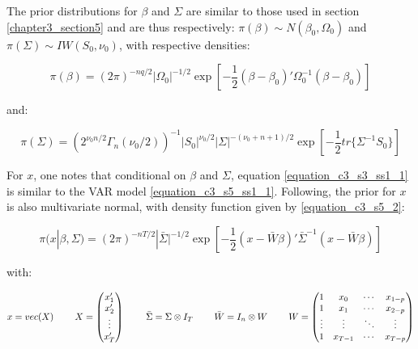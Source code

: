 The prior distributions for $\beta$ and $\Sigma$ are similar to those used in section \ref{chapter3_section5} and are thus respectively: $\pi(\beta) \sim N(\beta_0, \Omega_0)$ and $\pi(\Sigma) \sim IW(S_0, \nu_0)$, with respective densities:

\begin{equation}
\pi(\beta) = (2 \pi)^{-nq/2} |\Omega_0|^{-1/2} \exp \left[ -\frac{1}{2} (\beta - \beta_0)' \Omega_0^{-1} (\beta - \beta_0) \right]
\label{equation_c3_s3_ss2_3}
\end{equation}

and:

\begin{equation}
\pi(\Sigma) = (2^{\nu_0 n /2} \Gamma_n(\nu_0/2))^{-1} |S_0|^{\nu_0/2} |\Sigma|^{-(\nu_0+n+1)/2} \exp \left[ - \frac{1}{2} tr \{ \Sigma^{-1} S_0 \}  \right]
\label{equation_c3_s3_ss2_4}
\end{equation} 

For $x$, one notes that conditional on $\beta$ and $\Sigma$, equation \ref{equation_c3_s3_ss1_1} is similar to the VAR model \ref{equation_c3_s5_ss1_1}. Following, the prior for $x$ is also multivariate normal, with density function given by \ref{equation_c3_s5_2}:

\begin{equation}
\pi(x| \beta, \Sigma) = (2 \pi)^{-nT/2} |\bar{\Sigma}|^{-1/2} \exp \left[ -\frac{1}{2} (x-\bar{W} \beta)' \bar{\Sigma}^{-1} (x-\bar{W} \beta) \right]
\label{equation_c3_s3_ss2_5}
\end{equation}

with:

\begin{equation}
x =  vec(X) \hspace{8mm} X = \left( \begin{matrix} x_1' \\ x_2' \\ \vdots \\ x_T' \end{matrix} \right) \hspace{8mm}
\bar{\Sigma} = \Sigma \otimes I_T  \hspace{8mm}
\bar{W} = I_n \otimes W \hspace{8mm}
W = \left( \begin{matrix} 1 & x_0 & \cdots & x_{1-p} \\ 1 & x_1 & \cdots & x_{2-p} \\ \vdots & \vdots & \ddots & \vdots \\ 1 & x_{T-1} & \cdots & x_{T-p} \end{matrix} \right)
\label{equation_c3_s3_ss2_6}
\end{equation}

